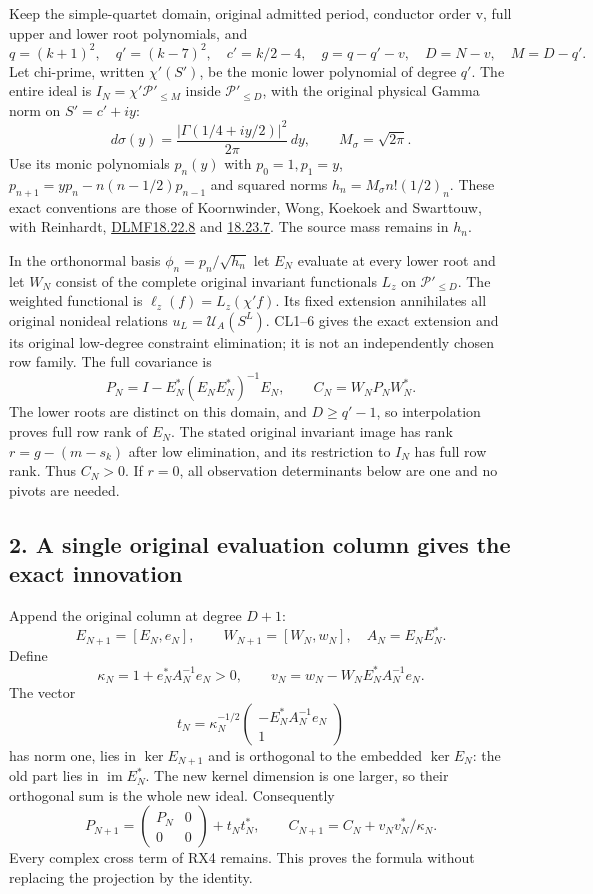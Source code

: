 \documentclass[11pt]{article}
\begin{document}
Keep the simple-quartet domain, original admitted period, conductor order v, full upper and lower root polynomials, and \[
q=(k+1)^2,\quad q'=(k-7)^2,\quad c'=k/2-4,
\quad g=q-q'-v,\quad D=N-v,\quad M=D-q'.
\tag{RX1}
\] Let chi-prime, written \(\chi'(S')\), be the monic lower polynomial of degree \(q'\). The entire ideal is \(I_N=\chi'\mathcal P'_{\le M}\) inside \(\mathcal P'_{\le D}\), with the original physical Gamma norm on \(S'=c'+iy\): \[
d\sigma(y)=\frac{|\Gamma(1/4+iy/2)|^2}{2\pi}\,dy,
\qquad M_\sigma=\sqrt{2\pi}.
\tag{RX2}
\] Use its monic polynomials \(p_n(y)\) with \(p_0=1,p_1=y\), \(p_{n+1}=yp_n-n(n-1/2)p_{n-1}\) and squared norms \(h_n=M_\sigma n!(1/2)_n\). These exact conventions are those of Koornwinder, Wong, Koekoek and Swarttouw, with Reinhardt, \href{https://dlmf.nist.gov/18.22.E8}{DLMF18.22.8} and \href{https://dlmf.nist.gov/18.23.E7}{18.23.7}. The source mass remains in \(h_n\).

In the orthonormal basis \(\phi_n=p_n/\sqrt{h_n}\) let \(E_N\) evaluate at every lower root and let \(W_N\) consist of the complete original invariant functionals \(L_z\) on \(\mathcal P'_{\le D}\). The weighted functional is \(\ell_z(f)=L_z(\chi'f)\). Its fixed extension annihilates all original nonideal relations \(u_L=\mathcal U_A(S^L)\). CL1--6 gives the exact extension and its original low-degree constraint elimination; it is not an independently chosen row family. The full covariance is \[
P_N=I-E_N^*(E_NE_N^*)^{-1}E_N,
\qquad C_N=W_NP_NW_N^*.
\tag{RX3}
\] The lower roots are distinct on this domain, and \(D\ge q'-1\), so interpolation proves full row rank of \(E_N\). The stated original invariant image has rank \(r=g-(m-s_k)\) after low elimination, and its restriction to \(I_N\) has full row rank. Thus \(C_N>0\). If \(r=0\), all observation determinants below are one and no pivots are needed.

\subsection{2. A single original evaluation column gives the exact innovation}\label{a-single-original-evaluation-column-gives-the-exact-innovation}

Append the original column at degree \(D+1\): \[
E_{N+1}=[E_N,e_N],\qquad W_{N+1}=[W_N,w_N],
\quad A_N=E_NE_N^*.
\] Define \[
\kappa_N=1+e_N^*A_N^{-1}e_N>0,\qquad
v_N=w_N-W_NE_N^*A_N^{-1}e_N.
\tag{RX4}
\] The vector \[
t_N=\kappa_N^{-1/2}
\begin{pmatrix}-E_N^*A_N^{-1}e_N\\1\end{pmatrix}
\tag{RX5}
\] has norm one, lies in \(\ker E_{N+1}\) and is orthogonal to the embedded \(\ker E_N\): the old part lies in \(\operatorname{im}E_N^*\). The new kernel dimension is one larger, so their orthogonal sum is the whole new ideal. Consequently \[
P_{N+1}=\begin{pmatrix}P_N&0\\0&0\end{pmatrix}+t_Nt_N^*,
\qquad
\boxed{C_{N+1}=C_N+v_Nv_N^*/\kappa_N.}
\tag{RX6}
\] Every complex cross term of RX4 remains. This proves the formula without replacing the projection by the identity.
\end{document}
